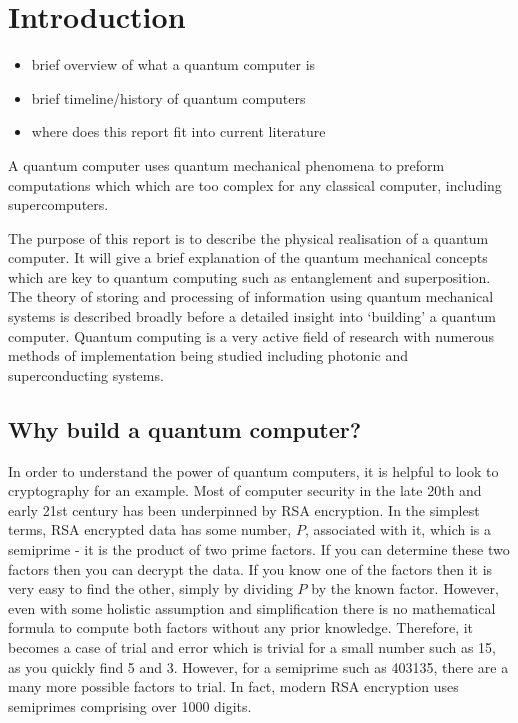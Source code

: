 \section{Introduction}
\begin{itemize}
    \item brief overview of what a quantum computer is
    \item brief timeline/history of quantum computers
    \item where does this report fit into current literature
\end{itemize}

A quantum computer uses quantum mechanical phenomena to preform computations which which are too complex for any classical computer, including supercomputers. \cite{noauthor_what_nodate}

The purpose of this report is to describe the physical realisation of a quantum computer. 
It will give a brief explanation of the quantum mechanical concepts which are key to quantum computing such as entanglement and superposition. 
The theory of storing and processing of information using quantum mechanical systems is described broadly before a detailed insight into `building' a quantum computer.
Quantum computing is a very active field of research with numerous methods of implementation being studied including photonic and superconducting systems. 
\subsection{Why build a quantum computer?}
In order to understand the power of quantum computers, it is helpful to look to cryptography for an example. Most of computer security in the late 20th and early 21st century has been underpinned by RSA encryption. In the simplest terms, RSA encrypted data has some number, $P$, associated with it, which is a semiprime - it is the product of two prime factors. If you can determine these two factors then you can decrypt the data. If you know one of the factors then it is very easy to find the other, simply by dividing $P$ by the known factor. However, even with some holistic assumption and simplification there is no mathematical formula to compute both factors without any prior knowledge. Therefore, it becomes a case of trial and error which is trivial for a small number such as 15, as you quickly find 5 and 3. However, for a semiprime such as 403135, there are a many more possible factors to trial. In fact, modern RSA encryption uses semiprimes comprising over 1000 digits.\\

